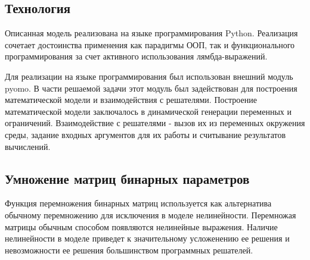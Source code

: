 

\subsection*{Технология}
Описанная модель реализована на языке программирования Python. Реализация сочетает достоинства применения как парадигмы ООП, так и функционального программирования за счет активного использования лямбда-выражений.

Для реализации на языке программирования был использован внешний модуль pyomo. В части решаемой задачи этот модуль был задействован для построения математической модели и взаимодействия с решателями. Построение математической модели заключалось в динамической генерации переменных и ограничений. Взаимодействие с решателями - вызов их из переменных окружения среды, задание входных аргументов для их работы и считывание результатов вычислений.

\subsection*{Умножение матриц бинарных параметров}
Функция перемножения бинарных матриц используется как альтернатива обычному перемножению для исключения в моделе нелинейности. Перемножая матрицы обычным способом появляются нелинейные выражения. Наличие нелинейности в моделе приведет к значительному усложенению ее решения и невозможности ее решения большинством программных решателей.

